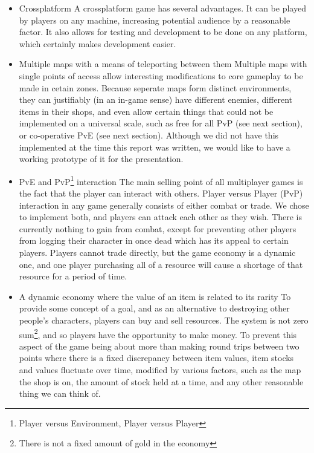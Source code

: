 \documentclass[12pt]{amsart}
\begin{document}
  \begin{itemize}
    \item Crossplatform
      A crossplatform game has several advantages. It can be played by players
      on any machine, increasing potential audience by a reasonable factor. It
      also allows for testing and development to be done on any platform, which
      certainly makes development easier.  

    \item Multiple maps with a means of teleporting between them
      Multiple maps with single points of access allow interesting modifications
      to core gameplay to be made in cetain zones.  Because seperate maps form
      distinct environments,  they can justifiably (in an in-game sense) have
      different enemies,  different items in their shops,  and even allow certain
      things that could not be implemented on a universal scale,  such as free
      for all PvP (see next section), or co-operative PvE (see next section).
      Although we did not have this implemented at the time this report was
      written, we would like to have a working prototype of it for the presentation.

    \item PvE and PvP\footnote{Player versus Environment, Player versus Player} interaction
      The main selling point of all multiplayer games is the fact that the player can
      interact with others.  Player versus Player (PvP) interaction in any game generally 
      consists of either combat or trade.  We chose to implement both,  and players can
      attack each other as they wish.  There is currently nothing to gain
      from combat,  except for preventing other players from logging their character
      in once dead which has its appeal to certain players.  Players cannot trade
      directly, but the game economy is a dynamic one,  and one player purchasing all
      of a resource will cause a shortage of that resource for a period of time.

    \item A dynamic economy where the value of an item is related to its rarity
      To provide some concept of a goal,  and as an alternative to destroying
      other people's characters,  players can buy and sell resources.  The system 
      is not zero sum\footnote{There is not a fixed amount of gold in the economy}, and
      so players have the opportunity to make money. To prevent this aspect of the game
      being about more than making round trips between two points where there 
      is a fixed discrepancy between item values,  item stocks and values fluctuate over time,
      modified by various factors,  such as the map the shop is on,  the amount of stock
      held at a time,  and any other reasonable thing we can think of.


  \end{itemize}
\end{document}
